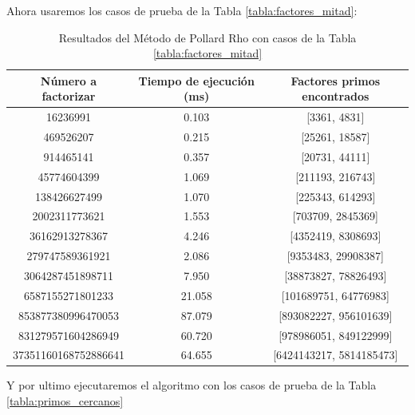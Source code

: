     Ahora usaremos los casos de prueba de la Tabla \ref{tabla:factores_mitad}:

    \begin{table}[H]
        \centering
        \begin{tabular}{ccc}
        \toprule
        Número a factorizar & Tiempo de ejecución (ms) & Factores primos encontrados\\
        \midrule
        16236991 & 0.103 & [3361, 4831]\\
        469526207 & 0.215 & [25261, 18587]\\
        914465141 & 0.357 & [20731, 44111]\\
        45774604399 & 1.069 & [211193, 216743]\\
        138426627499 & 1.070 & [225343, 614293]\\
        2002311773621 & 1.553 & [703709, 2845369]\\
        36162913278367 & 4.246 & [4352419, 8308693]\\
        279747589361921 & 2.086 & [9353483, 29908387]\\
        3064287451898711 & 7.950 & [38873827, 78826493]\\
        6587155271801233 & 21.058 & [101689751, 64776983]\\
        853877380996470053 & 87.079 & [893082227, 956101639]\\
        831279571604286949 & 60.720 & [978986051, 849122999]\\
        37351160168752886641 & 64.655 & [6424143217, 5814185473]\\
        \bottomrule
        \end{tabular}
        \caption{Resultados del Método de Pollard Rho con casos de la Tabla \ref{tabla:factores_mitad}}
        \label{tab:res-pollard-rho-mitad}
    \end{table}

    Y por ultimo ejecutaremos el algoritmo con los casos de prueba de la Tabla \ref{tabla:primos_cercanos}
    
